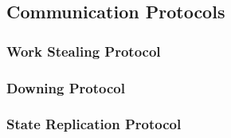\subsection{Communication Protocols}

\subsubsection{Work Stealing Protocol}

\subsubsection{Downing Protocol}

\subsubsection{State Replication Protocol}
